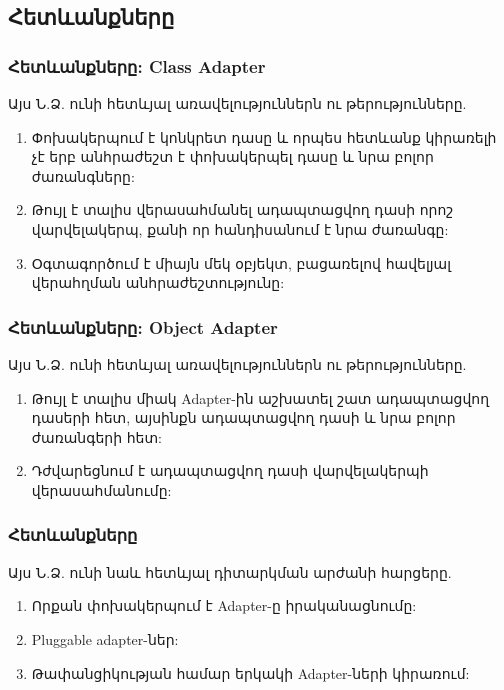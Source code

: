 \documentclass{beamer}
\begin{document}
\subsection{Հետևանքները}
\begin{frame}\frametitle{Հետևանքները: Class Adapter}
Այս Ն.Ձ. ունի հետևյալ առավելություններն ու թերությունները.
\vfill
\begin{enumerate}
    \item Փոխակերպում է կոնկրետ դասը և որպես հետևանք կիրառելի չէ երբ անհրաժեշտ է
    փոխակերպել դասը և նրա բոլոր ժառանգները: \vfill
    \item Թույլ է տալիս վերասահմանել ադապտացվող դասի որոշ վարվելակերպ, քանի որ
    հանդիսանում է նրա ժառանգը: \vfill
    \item Օգտագործում է միայն մեկ օբյեկտ, բացառելով հավելյալ վերահղման անհրաժեշտությունը:
\end{enumerate}
\end{frame}

\begin{frame}\frametitle{Հետևանքները: Object Adapter}
Այս Ն.Ձ. ունի հետևյալ առավելություններն ու թերությունները.
\vfill
\begin{enumerate}
    \item Թույլ է տալիս միակ Adapter-ին աշխատել շատ ադապտացվող դասերի հետ,
    այսինքն ադապտացվող դասի և նրա բոլոր ժառանգերի հետ: \vfill
    \item Դժվարեցնում է ադապտացվող դասի վարվելակերպի վերասահմանումը:
\end{enumerate}
\end{frame}

\begin{frame}\frametitle{Հետևանքները}
Այս Ն.Ձ. ունի նաև հետևյալ դիտարկման արժանի հարցերը.
\vfill
\begin{enumerate}
    \item Որքան փոխակերպում է Adapter-ը իրականացնումը: \vfill
    \item Pluggable adapter-ներ: \vfill
    \item Թափանցիկության համար երկակի Adapter-ների կիրառում:
\end{enumerate}
\end{frame}
\end{document}
